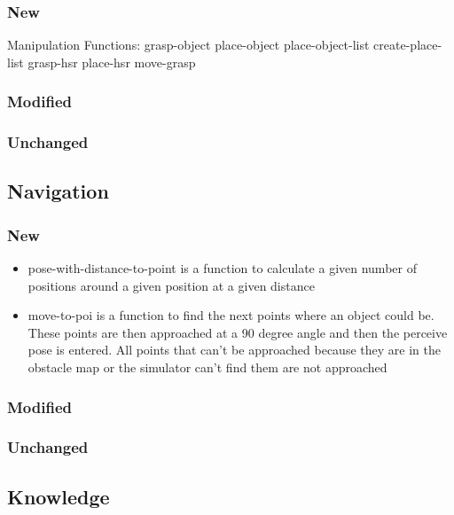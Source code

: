 \documentclass[main.tex]{subfiles}
\begin{document}
                \subsubsection{New}
                Manipulation Functions:
                grasp-object
                place-object
                place-object-list
                create-place-list
                grasp-hsr
                place-hsr
                move-grasp
                \subsubsection{Modified}
                \subsubsection{Unchanged}
                
                \subsection{Navigation}
                \subsubsection{New}
                \begin{itemize}
 				 \item pose-with-distance-to-point is a function to calculate a given number of positions around a given position at a given distance
 				 \item move-to-poi is a function to find the next points where an object could be. These points are then approached at a 90 degree angle and then the perceive pose is entered. All points that can't be approached because they are in the obstacle map or the simulator can't find them are not approached
				\end{itemize}
                \subsubsection{Modified}
                \subsubsection{Unchanged}
                
                \subsection{Knowledge}
\end{document}
